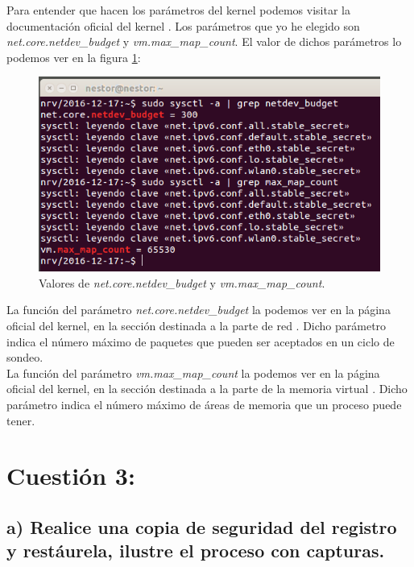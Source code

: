 \documentclass[a4paper,titlepage,12pt]{scrartcl}	%
\numberwithin{figure}{section} %
\numberwithin{table}{section} %
\begin{document}
	Para entender que hacen los parámetros del kernel podemos visitar la documentación oficial del kernel \cite{kernel_doc}. Los parámetros que yo he elegido son \textit{net.core.netdev\_budget} y \textit{vm.max\_map\_count}. El valor de dichos parámetros lo podemos ver en la figura \ref{2-2}:
	
	\begin{figure}[H]
		\includegraphics[width=\linewidth]{./Imagenes/2-2.png}
		\vspace{-0.5cm}
		\caption[Valores de \textit{net.core.netdev\_budget} y \textit{vm.max\_map\_count}.]{Valores de \textit{net.core.netdev\_budget} y \textit{vm.max\_map\_count}.}
		\label{2-2}
	\end{figure}
	
	La función del parámetro \textit{net.core.netdev\_budget} la podemos ver en la página oficial del kernel, en la sección destinada a la parte de red \cite{net}. Dicho parámetro indica el número máximo de paquetes que pueden ser aceptados en un ciclo de sondeo. \\
	
	La función del parámetro \textit{vm.max\_map\_count} la podemos ver en la página oficial del kernel, en la sección destinada a la parte de la memoria virtual \cite{vm}. Dicho parámetro indica el número máximo de áreas de memoria que un proceso puede tener.
	
	\section[Cuestión 3: ]{Cuestión 3: }
	\subsection[a) Realice una copia de seguridad del registro y restáurela, ilustre el proceso con capturas.]{a) Realice una copia de seguridad del registro y restáurela, ilustre el proceso con capturas.}
	
\end{document}
